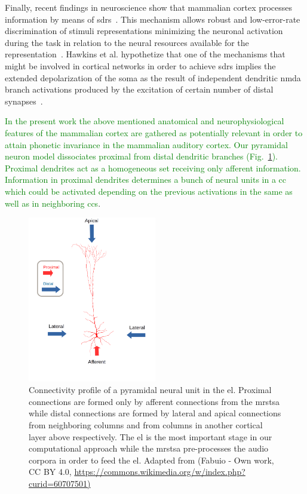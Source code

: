 \documentclass[10pt,letterpaper]{article}
\begin{document}
Finally, recent findings in neuroscience show that mammalian cortex processes information by means of \glspl{sdr}~\cite{barth_2012}. This mechanism allows robust and low-error-rate discrimination of stimuli representations minimizing the neuronal activation during the task in relation to the neural resources available for the representation~\cite{ahmad_2016}. Hawkins et al. \cite{hawkins_2016} hypothetize that one of the mechanisms that might be involved in cortical networks in order to achieve \glspl{sdr} implies the extended depolarization of the soma as the result of independent dendritic \gls{nmda} branch activations produced by the excitation of certain number of distal synapses~\cite{antic_2010, major_2013}.

\textcolor{green}{In the present work the above mentioned anatomical and neurophysiological features of the mammalian cortex are gathered as potentially relevant in order to attain phonetic invariance in the mammalian auditory cortex. Our pyramidal neuron model dissociates proximal from distal dendritic branches (Fig.~\ref{fig:PyramidalCell}). Proximal dendrites act as a homogeneous set receiving only afferent information. Information in proximal dendrites determines a bunch of neural units in a \gls{cc} which could be activated depending on the previous activations in the same as well as in neighboring \glspl{cc}}.

\begin{figure}[h!]
    \centering
    \includegraphics[width=0.5\textwidth]{PyramidalCell.png}
    \caption{Connectivity profile of a pyramidal neural unit in the \gls{el}.
    Proximal connections are formed only by afferent connections from the \gls{mrstsa}
    while distal connections are formed by lateral and apical connections from neighboring columns and
    from columns in another cortical layer above respectively.
    The \gls{el} is the most important stage in our computational approach while the \gls{mrstsa} pre-processes the audio corpora in order to feed the \gls{el}.
    Adapted from 
    (Fabuio - Own work, CC BY 4.0, \url{https://commons.wikimedia.org/w/index.php?curid=60707501)}}
    \label{fig:PyramidalCell}
\end{figure}
\end{document}
